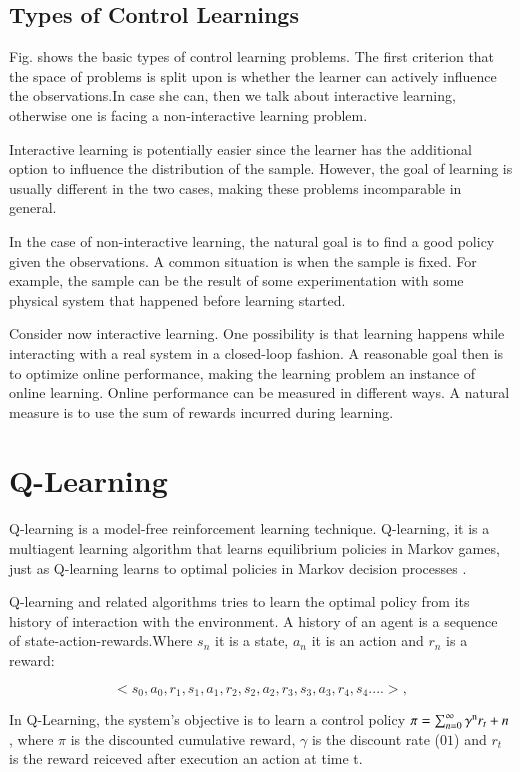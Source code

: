 \subsection{Types of Control Learnings}


Fig. shows the basic types of control learning problems. The first criterion that the space of problems is split upon is whether the learner can actively influence the observations.In case she can, then we talk about interactive learning, otherwise one is facing a non-interactive learning problem.

Interactive learning is potentially easier since the learner has the additional option to influence the distribution of the sample. However, the goal of
learning is usually different in the two cases, making these problems incomparable in general.

In the case of non-interactive learning, the natural goal is to find a good policy given the observations.
A common situation is when the sample is fixed. For example, the sample can be the result of some experimentation with some physical system that happened before learning started. 

Consider now interactive learning. One possibility is that learning happens while interacting
with a real system in a closed-loop fashion. A reasonable goal then is to optimize online performance,
making the learning problem an instance of online learning. Online performance
can be measured in different ways. A natural measure is to use the sum of rewards incurred
during learning. 



\section{Q-Learning}

Q-learning is a model-free reinforcement learning technique. Q-learning, it is a multiagent learning algorithm that learns equilibrium policies in Markov games, just as Q-learning learns to optimal policies in Markov decision processes \cite{Greenwald2003}. 

Q-learning and related algorithms tries to learn the optimal policy from its history of interaction with the environment. A history of an agent is a sequence of state-action-rewards.Where $s_{n}$ it is a state, $a_{n}$ it is an action and $r_{n}$ is a reward:

\begin{equation}
<s_{0},a_{0},r_{1},s_{1},a_{1},r_{2},s_{2},a_{2},r_{3},s_{3},a_{3},r_{4},s_{4}....>,
\end{equation}


In Q-Learning, the system's objective is to learn a control policy $\pi = \sum_{n=0}^{\infty} \gamma\textsuperscript{n}  r_{t}+n $, where $\pi$  is the discounted cumulative reward, $\gamma$ is the discount rate ($01$) and $r_{t}$ is the reward reiceved after execution an action at time t.

